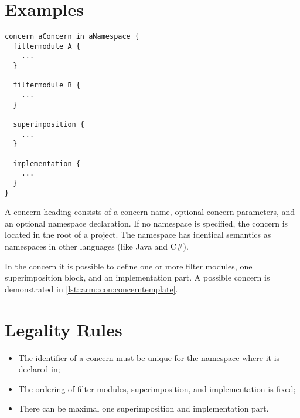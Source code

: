 \section*{Examples}
\begin{lstlisting}[language={Composestar},style=floatlisting, caption={Abstract example of a concern}, label={lst::arm::con:concerntemplate}, floatplacement=tbp]
concern aConcern in aNamespace {
  filtermodule A {
    ...
  }
  
  filtermodule B {
    ...
  }
  
  superimposition {
    ...
  }
  
  implementation {
    ...
  }
}
\end{lstlisting}
A concern heading consists of a concern name, optional concern parameters, and an optional namespace declaration.
If no namespace is specified, the concern is located in the root of a project.
The namespace has identical semantics as namespaces in other languages (like Java and C\#).

In the concern it is possible to define one or more filter modules, one superimposition block, and an implementation part. 
A possible concern is demonstrated in \autoref{lst::arm::con:concerntemplate}.

\section*{Legality Rules}
\begin{itemize}[noitemsep]
\item The identifier of a concern must be unique for the namespace where it is declared in;
\item The ordering of filter modules, superimposition, and implementation is fixed;
\item There can be maximal one superimposition and implementation part.
\end{itemize}

\comments{}
